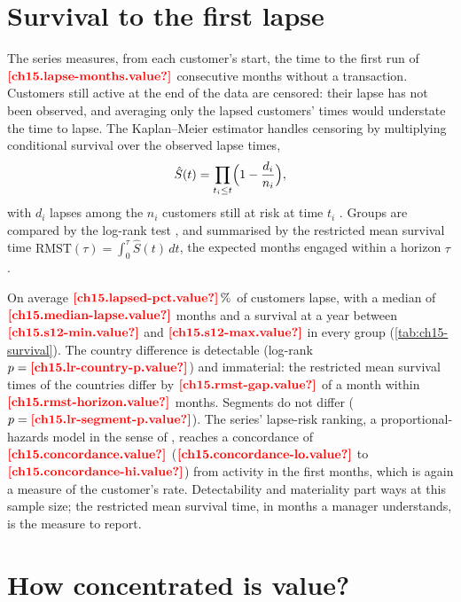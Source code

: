 \section{Survival to the first lapse}\label{sec:cd-survival}

The series measures, from each customer's start, the time to the first run of $\est{ch15.lapse-months}{value}$ consecutive months without a transaction. Customers
still active at the end of the data are censored: their lapse has not been observed, and averaging only the lapsed customers'
times would understate the time to lapse. The Kaplan--Meier estimator handles censoring by multiplying conditional survival
over the observed lapse times,
\begin{equation}\label{eq:cd-km}
  \hat S(t) = \prod_{t_i \le t} \Bigl(1 - \frac{d_i}{n_i}\Bigr),
\end{equation}
with $d_i$ lapses among the $n_i$ customers still at risk at time $t_i$ \autocite{kaplan1958}. Groups are compared by the
log-rank test \autocite{peto1972}, and summarised by the restricted mean survival time
$\mathrm{RMST}(\tau) = \int_0^\tau \hat S(t)\,dt$, the expected months engaged within a horizon $\tau$ \autocite{royston2013}.

On average $\est{ch15.lapsed-pct}{value}\,\%$ of customers lapse, with a median of $\est{ch15.median-lapse}{value}$ months and a
survival at a year between $\est{ch15.s12-min}{value}$ and $\est{ch15.s12-max}{value}$ in every group
(\cref{tab:ch15-survival}). The country difference is detectable (log-rank $p = \est{ch15.lr-country-p}{value}$) and
immaterial: the restricted mean survival times of the countries differ by $\est{ch15.rmst-gap}{value}$ of a month within $\est{ch15.rmst-horizon}{value}$ months. Segments do not differ ($p = \est{ch15.lr-segment-p}{value}$). The series' lapse-risk ranking, a proportional-hazards
model in the sense of \textcite{cox1972}, reaches a concordance of $\est{ch15.concordance}{value}$
($\est{ch15.concordance-lo}{value}$ to $\est{ch15.concordance-hi}{value}$) from activity in the first months, which is again a
measure of the customer's rate. Detectability and materiality part ways at this sample size; the restricted mean survival time,
in months a manager understands, is the measure to report.



\section{How concentrated is value?}\label{sec:cd-value}

